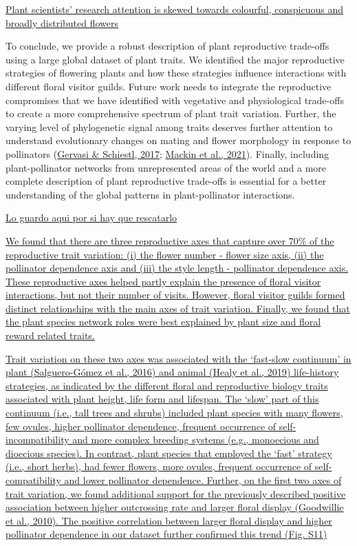 \documentclass[
  12pt,
  a4paper,
]{article}
\begin{document}
\href{May\%20be\%20interesting\%20to\%20comment\%20on}{Plant scientists' research attention is skewed towards colourful, conspicuous and broadly distributed flowers}

To conclude, we provide a robust description of plant reproductive trade-offs using a large global dataset of plant traits. We identified the major reproductive strategies of flowering plants and how these strategies influence interactions with different floral visitor guilds. Future work needs to integrate the reproductive compromises that we have identified with vegetative and physiological trade-offs to create a more comprehensive spectrum of plant trait variation. Further, the varying level of phylogenetic signal among traits deserves further attention to understand evolutionary changes on mating and flower morphology in response to pollinators (\protect\hyperlink{ref-gervasi2017}{Gervasi \& Schiestl, 2017}; \protect\hyperlink{ref-mackin2021}{Mackin et al., 2021}). Finally, including plant-pollinator networks from unrepresented areas of the world and a more complete description of plant reproductive trade-offs is essential for a better understanding of the global patterns in plant-pollinator interactions.

\href{Jose}{Lo guardo aqui por si hay que rescatarlo}

\href{old\%20text}{We found that there are three reproductive axes that capture over 70\% of the reproductive trait variation: (i) the flower number - flower size axis, (ii) the pollinator dependence axis and (iii) the style length - pollinator dependence axis. These reproductive axes helped partly explain the presence of floral visitor interactions, but not their number of visits. However, floral visitor guilds formed distinct relationships with the main axes of trait variation. Finally, we found that the plant species network roles were best explained by plant size and floral reward related traits.}

\href{}{Trait variation on these two axes was associated with the `fast-slow continuum' in plant (\protect\hyperlink{ref-salguero2016}{Salguero-Gómez et al., 2016}) and animal (\protect\hyperlink{ref-healy2019}{Healy et al., 2019}) life-history strategies, as indicated by the different floral and reproductive biology traits associated with plant height, life form and lifespan. The `slow' part of this continuum (i.e., tall trees and shrubs) included plant species with many flowers, few ovules, higher pollinator dependence, frequent occurrence of self-incompatibility and more complex breeding systems (e.g., monoecious and dioecious species). In contrast, plant species that employed the `fast' strategy (i.e., short herbs), had fewer flowers, more ovules, frequent occurrence of self-compatibility and lower pollinator dependence. Further, on the first two axes of trait variation, we found additional support for the previously described positive association between higher outcrossing rate and larger floral display (\protect\hyperlink{ref-goodwillie2010}{Goodwillie et al., 2010}). The positive correlation between larger floral display and higher pollinator dependence in our dataset further confirmed this trend (Fig. S11)}
\end{document}

